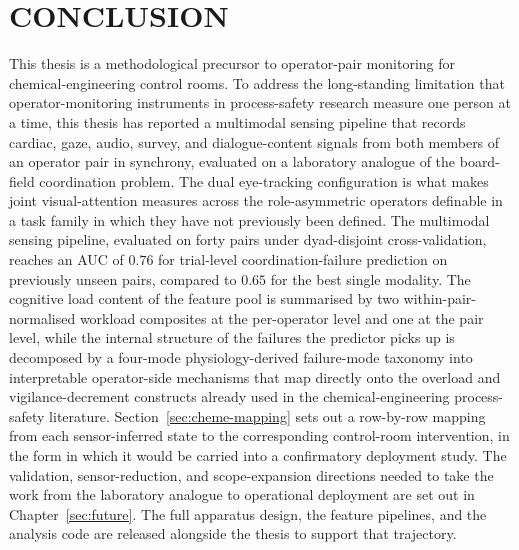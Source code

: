 \chapter{CONCLUSION}\label{sec:conclusion}
This thesis is a methodological precursor to operator-pair monitoring for chemical-engineering control rooms. To address the long-standing limitation that operator-monitoring instruments in process-safety research measure one person at a time, this thesis has reported a multimodal sensing pipeline that records cardiac, gaze, audio, survey, and dialogue-content signals from both members of an operator pair in synchrony, evaluated on a laboratory analogue of the board-field coordination problem. The dual eye-tracking configuration is what makes joint visual-attention measures across the role-asymmetric operators definable in a task family in which they have not previously been defined. The multimodal sensing pipeline, evaluated on forty pairs under dyad-disjoint cross-validation, reaches an AUC of $0.76$ for trial-level coordination-failure prediction on previously unseen pairs, compared to $0.65$ for the best single modality. The cognitive load content of the feature pool is summarised by two within-pair-normalised workload composites at the per-operator level and one at the pair level, while the internal structure of the failures the predictor picks up is decomposed by a four-mode physiology-derived failure-mode taxonomy into interpretable operator-side mechanisms that map directly onto the overload and vigilance-decrement constructs already used in the chemical-engineering process-safety literature. Section~\ref{sec:cheme-mapping} sets out a row-by-row mapping from each sensor-inferred state to the corresponding control-room intervention, in the form in which it would be carried into a confirmatory deployment study. The validation, sensor-reduction, and scope-expansion directions needed to take the work from the laboratory analogue to operational deployment are set out in Chapter~\ref{sec:future}. The full apparatus design, the feature pipelines, and the analysis code are released alongside the thesis to support that trajectory.



